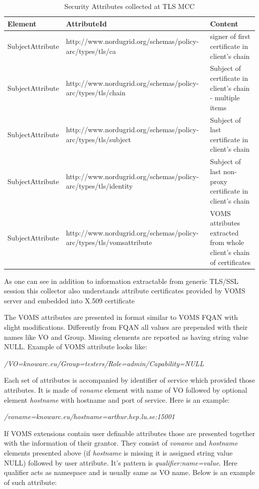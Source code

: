 \documentclass{article}                            %
\begin{document}
\begin{table}[ht]
\caption{Security Attributes collected at TLS MCC}
\centering
\begin{tabular}{| l | p{7cm} | p{5cm} |}
\hline
\textbf{Element} & \textbf{AttributeId} & \textbf{Content} \\ \hline
SubjectAttribute & http://www.nordugrid.org/schemas/policy-arc/types/tls/ca & signer of first certificate in client's chain
 \\ \hline
SubjectAttribute & http://www.nordugrid.org/schemas/policy-arc/types/tls/chain & Subject of certificate in client's chain - multiple items \\ \hline
SubjectAttribute & http://www.nordugrid.org/schemas/policy-arc/types/tls/subject & Subject of last certificate in client's chain \\ \hline
SubjectAttribute & http://www.nordugrid.org/schemas/policy-arc/types/tls/identity & Subject of last non-proxy certificate in client's chain \\ \hline
SubjectAttribute & http://www.nordugrid.org/schemas/policy-arc/types/tls/vomsattribute & VOMS attributes extracted from whole client's chain of certificates \\ \hline
\end{tabular}
\label{table:tls_attr}
\end{table}

As one can see in addition to information extractable from generic TLS/SSL session this collector also understands attribute certificates provided by VOMS server and embedded into X.509 certificate

The VOMS attributes are presented in format similar to VOMS FQAN with slight modifications. Differently from FQAN all values are prepended with their names like VO and Group. Missing elements are reported as having string value NULL. Example of VOMS attribute looks like:

\emph{/VO=knowarc.eu/Group=testers/Role=admin/Capability=NULL}

Each set of attributes is accompanied by identifier of service which provided those attributes. It is made of \textit{voname} element with name of VO followed by optional element \textit{hostname} with hostname and port of service. Here is an example:

\emph{/voname=knowarc.eu/hostname=arthur.hep.lu.se:15001}

If VOMS extensions contain user definable attributes those are presented together with the information of their grantor. They consist of \textit{voname} and \textit{hostname} elements presented above (if \textit{hostname} is missing it is assigned string value NULL) followed by user attribute. It's pattern is \textit{qualifier:name=value}. Here qualifier acts as namespace and is usually same as VO name. Below is an example of such attribute:
\end{document}
